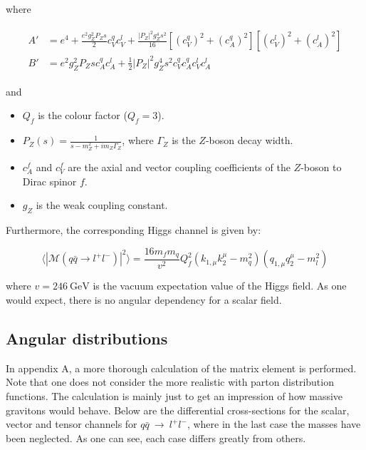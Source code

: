 \documentclass[11pt,a4paper]{article}
\begin{document}
where

\begin{align}
	\begin{split}
	A' &= e^4 + \frac{e^2g_Z^2P_Zs}{2}c_V^qc_V^l + \frac{|P_Z|^2 g_Z^4 s^2}{16}\left[\left(c_V^q\right)^2 + \left(c_A^q\right)^2\right]\left[\left(c_V^l\right)^2 + \left(c_A^l\right)^2\right]\\
	B' &= e^2g_Z^2P_Zsc_A^qc_A^l + \frac{1}{2}|P_Z|^2g_Z^4s^2 c_V^qc_A^qc_V^l c_A^l
	\end{split}
\end{align}

and
\begin{itemize}
	\item $Q_f$ is the colour factor ($Q_f = 3$).
	\item $P_Z(s) = \frac{1}{s-m_Z^2 + im_Z\Gamma_Z}$, where $\Gamma_Z$ is the $Z$-boson decay width.
	\item $c^f_A$ and $c^f_V$ are the axial and vector coupling coefficients of the $Z$-boson to Dirac spinor $f$.
	\item $g_Z$ is the weak coupling constant.
\end{itemize}

Furthermore, the corresponding Higgs channel is given by:

\begin{equation}
	\langle|\mathcal{M}(q\bar{q}\rightarrow l^+l^-)|^2\rangle = \frac{16m_fm_q}{v^2}Q_f^2\left(k_{1,\mu}k_2^\mu - m_q^2\right)\left(q_{1,\mu}q_2^\mu - m_l^2\right)
\end{equation}

where $v=246\:\text{GeV}$ is the vacuum expectation value of the Higgs field. As one would expect, there is no angular dependency for a scalar field.

\subsection{Angular distributions}
In appendix A, a more thorough calculation of the matrix element is performed. Note that one does not consider the more realistic with parton distribution functions. The calculation is mainly just to get an impression of how massive gravitons would behave.
Below are the differential cross-sections for the scalar, vector and tensor channels for $q\bar{q}\:\rightarrow\:l^+l^-$, where in the last case the masses have been neglected. As one can see, each case differs greatly from others.
\end{document}
